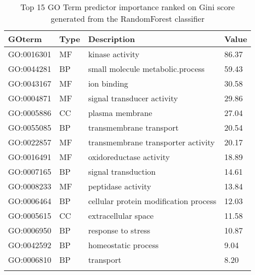 \documentclass[a4paper,8pt,twocolumn,5p]{elsarticle}
\begin{document}
\begin{table}[ht]
\centering \scriptsize \caption{Top 15 GO Term predictor importance ranked on Gini score generated from the RandomForest classifier}
\label{pred}
\begin{tabular}{llll}
  \hline
 GOterm & Type &  Description & Value \\ 
  \hline
GO:0016301&MF&kinase activity & 86.37 \\ 
GO:0044281&BP&small molecule metabolic.process & 59.43 \\ 
GO:0043167&MF&ion binding & 30.58 \\ 
GO:0004871&MF&signal transducer activity & 29.86 \\ 
GO:0005886&CC&plasma membrane & 27.04 \\ 
GO:0055085&BP&transmembrane transport & 20.54 \\ 
GO:0022857&MF&transmembrane transporter activity & 20.17 \\ 
GO:0016491&MF&oxidoreductase activity & 18.89 \\ 
GO:0007165&BP&signal transduction & 14.61 \\ 
GO:0008233&MF&peptidase activity & 13.84 \\ 
GO:0006464&BP&cellular protein modification process & 12.03 \\ 
GO:0005615&CC&extracellular space & 11.58 \\ 
GO:0006950&BP&response to stress & 10.87 \\ 
GO:0042592&BP&homeostatic process & 9.04 \\ 
GO:0006810&BP&transport & 8.20 \\ 
   \hline \normalsize
\end{tabular}
\end{table}
\end{document}
